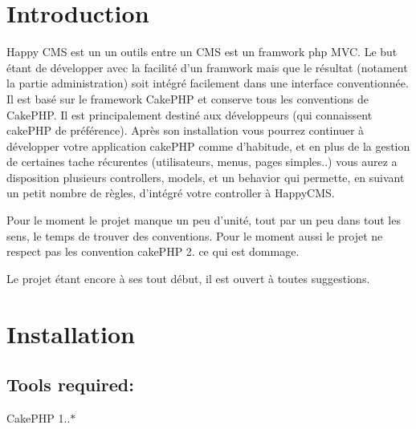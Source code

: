 \hypertarget{index_intro_sec}{}\section{\-Introduction}\label{index_intro_sec}
\-Happy \-C\-M\-S est un un outils entre un \-C\-M\-S est un framwork php \-M\-V\-C. \-Le but étant de développer avec la facilité d'un framwork mais que le résultat (notament la partie administration) soit intégré facilement dans une interface conventionnée. \-Il est basé sur le framework \-Cake\-P\-H\-P et conserve tous les conventions de \-Cake\-P\-H\-P. \-Il est principalement destiné aux développeurs (qui connaissent cake\-P\-H\-P de préférence). \-Après son installation vous pourrez continuer à développer votre application cake\-P\-H\-P comme d'habitude, et en plus de la gestion de certaines tache récurentes (utilisateurs, menus, pages simples..) vous aurez a disposition plusieurs controllers, models, et un behavior qui permette, en suivant un petit nombre de règles, d'intégré votre controller à \-Happy\-C\-M\-S. \par
\par
 \-Pour le moment le projet manque un peu d'unité, tout par un peu dans tout les sens, le temps de trouver des conventions. \-Pour le moment aussi le projet ne respect pas les convention cake\-P\-H\-P 2. ce qui est dommage. \par
\par
 \-Le projet étant encore à ses tout début, il est ouvert à toutes suggestions.\hypertarget{index_install_sec}{}\section{\-Installation}\label{index_install_sec}
\hypertarget{index_tools_subsec}{}\subsection{\-Tools required\-:}\label{index_tools_subsec}

\begin{DoxyItemize}
\item \-Cake\-P\-H\-P 1..$\ast$
\end{DoxyItemize}

